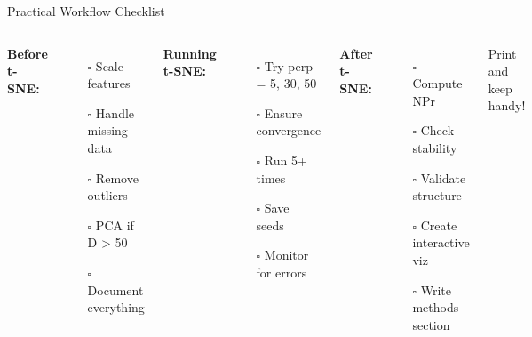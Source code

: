 \documentclass[aspectratio=169]{beamer}
\begin{document}
\begin{frame}{Practical Workflow Checklist}
\begin{columns}
\textbf{Before t-SNE:}
\begin{itemize}
\item[$\square$] Scale features
\item[$\square$] Handle missing data
\item[$\square$] Remove outliers
\item[$\square$] PCA if D > 50
\item[$\square$] Document everything
\end{itemize}

\textbf{Running t-SNE:}
\begin{itemize}
\item[$\square$] Try perp = 5, 30, 50
\item[$\square$] Ensure convergence
\item[$\square$] Run 5+ times
\item[$\square$] Save seeds
\item[$\square$] Monitor for errors
\end{itemize}

\textbf{After t-SNE:}
\begin{itemize}
\item[$\square$] Compute NPr
\item[$\square$] Check stability
\item[$\square$] Validate structure
\item[$\square$] Create interactive viz
\item[$\square$] Write methods section
\end{itemize}

\vspace{0.5cm}
\colorbox{yellow!30}{Print and keep handy!}
\end{columns}
\end{frame}
\end{document}
